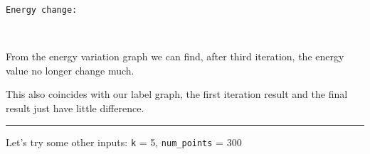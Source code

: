 \documentclass[11pt]{article}
\begin{document}
    \begin{Verbatim}[commandchars=\\\{\}]

Energy change:

    \end{Verbatim}

    \begin{center}
    \end{center}
    { \hspace*{\fill} \\}
    
    From the energy variation graph we can find, after third iteration, the
energy value no longer change much.

This also coincides with our label graph, the first iteration result and
the final result just have little difference.

    \begin{center}\rule{0.5\linewidth}{\linethickness}\end{center}

Let's try some other inputs: \texttt{k} = 5, \texttt{num\_points} = 300
\end{document}
